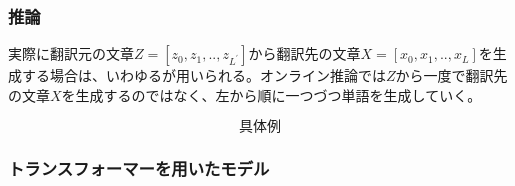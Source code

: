 \subsubsection{推論}
実際に翻訳元の文章$Z = [z_0, z_1, .., z_{L^\prime}]$から翻訳先の文章$X = [x_0, x_1, .., x_{L}]$を生成する場合は、いわゆるが用いられる。オンライン推論では$Z$から一度で翻訳先の文章$X$を生成するのではなく、左から順に一つづつ単語を生成していく。


\begin{equation*}
  \text{具体例}
\end{equation*}


\subsubsection{トランスフォーマーを用いたモデル}